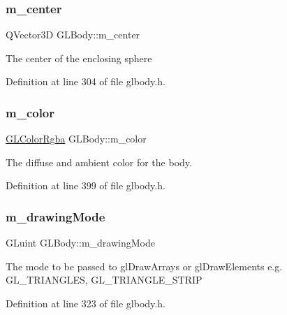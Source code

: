 \mbox{\label{class_g_l_body_afffadedad59d067a5fd8cd24d82ab95b}} 
\subsubsection{\texorpdfstring{m\_center}{m\_center}}
{\footnotesize\ttfamily Q\+Vector3D G\+L\+Body\+::m\+\_\+center\hspace{0.3cm}{\ttfamily [protected]}}

The center of the enclosing sphere 

Definition at line 304 of file glbody.\+h.

\mbox{\label{class_g_l_body_a267b5c0fbe5752370197012975663dca}} 
\subsubsection{\texorpdfstring{m\_color}{m\_color}}
{\footnotesize\ttfamily \mbox{\hyperlink{class_g_l_color_rgba}{G\+L\+Color\+Rgba}} G\+L\+Body\+::m\+\_\+color\hspace{0.3cm}{\ttfamily [protected]}}

The diffuse and ambient color for the body. 

Definition at line 399 of file glbody.\+h.

\mbox{\label{class_g_l_body_a3c6c3d3afde4a1990c3cc97976fd5bd8}} 
\subsubsection{\texorpdfstring{m\_drawingMode}{m\_drawingMode}}
{\footnotesize\ttfamily G\+Luint G\+L\+Body\+::m\+\_\+drawing\+Mode\hspace{0.3cm}{\ttfamily [protected]}}

The mode to be passed to gl\+Draw\+Arrays or gl\+Draw\+Elements e.\+g. G\+L\+\_\+\+T\+R\+I\+A\+N\+G\+L\+ES, G\+L\+\_\+\+T\+R\+I\+A\+N\+G\+L\+E\+\_\+\+S\+T\+R\+IP 

Definition at line 323 of file glbody.\+h.

\mbox{\label{class_g_l_body_afd247051378cdf8d444cb7af288cb012}} 
